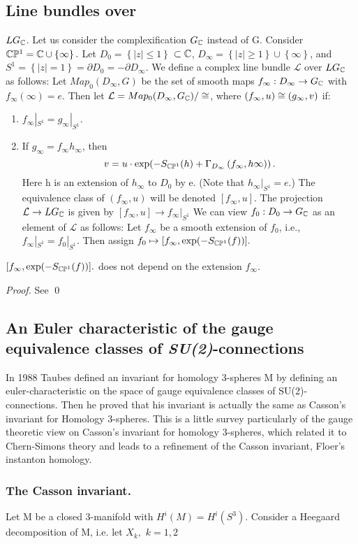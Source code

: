 \subsection{Line bundles over} $LG_{\mathbb{C}}$. Let us consider the complexification $G_{\mathbb{C}}$ instead of G.
Consider $\mathbb{C} \mathbb{P}^{1} = \mathbb{C} \cup \left\lbrace \infty \right\rbrace.$ Let $D_{0} = \left\lbrace |z| 
\leq 1 \right\rbrace$ $\subset \mathbb{C}$, $D_\infty = \left\lbrace |z| \geq 1 \right\rbrace \cup \left\lbrace \infty \right\rbrace$,
and $S^1 = \left\lbrace |z| = 1 \right\rbrace = \partial D_{0} = - \partial D_{\infty}$.
We define a complex line bundle $\mathcal{L}$ over $LG_{\mathbb{C}}$ as follows: Let $Map_{0}(D_{\infty},G)$ be the set of smooth
maps $f_\infty: D_\infty \rightarrow G_{\mathbb{C}}$ with $f_\infty(\infty) = e.$ Then let 
$\mathcal{L} = Map_{0}(D_\infty, G_{\mathbb{C}})/\cong$, where $\left(f_\infty, u \right) \cong (g_\infty, v)$ if:
\begin{enumerate}
 \item $f_{\infty}|_{S^{1}} = g_\infty|_{S^{1}}.$
 \item If $g_\infty = f_\infty h_\infty$, then 
 \begin{equation*}
  v = u \cdot \exp (-S_{\mathbb{C} \mathbb{P}^{1}}(h) + \Gamma_{D_{\infty}}\left( f_\infty, h\infty)\right).
 \end{equation*}
Here h is an extension of $h_\infty$ to $D_0$ by e. (Note that $h_\infty|_{S^{1}} = e.$)
The equivalence class of $(f_\infty, u)$ will be denoted $[f_\infty, u]$. The projection $\mathcal{L} \rightarrow 
LG_{\mathbb{C}}$ is given by $[f_\infty, u] \rightarrow f_{\infty}|_{S^{1}}$
We can view $f_0:D_0 \rightarrow G_{\mathbb{C}}$ as an element of $\mathcal{L}$ as follows: Let $f_\infty$ be a smooth extension
of $f_0$, i.e., $f_\infty |_{S^{1}} = f_{0}|_{S^{1}}.$ Then assign $f_0 \mapsto [f_\infty, 
\exp (-S_{\mathbb{C} \mathbb{P}^{1}}(f))].$
\end{enumerate}
\begin{lemma} $ [f_\infty, 
\exp (-S_{\mathbb{C} \mathbb{P}^{1}}(f))].$ does not depend on the extension $f_\infty$.
\begin{proof}
 See \qed
\end{proof}

\end{lemma}
\subsection{An Euler characteristic of the gauge equivalence classes of \textit{SU(2)}-connections}
In 1988 Taubes defined an invariant for homology 3-spheres M by defining an euler-characteristic on the space of gauge
equivalence classes of SU(2)-connections. Then he proved that his invariant is actually the same as Casson's invariant for
Homology 3-spheres. This is a little survey particularly of the gauge theoretic view on Casson's invariant for homology
3-spheres, which related it to Chern-Simons theory and leads to a refinement of the Casson invariant, Floer's instanton homology.
\subsubsection{The Casson invariant.} Let M be a closed 3-manifold with $H^{i}(M) = H^{i}(S^{3})$.
Consider a Heegaard decomposition of M, i.e. let $X_{k},$ $k = 1,2$

